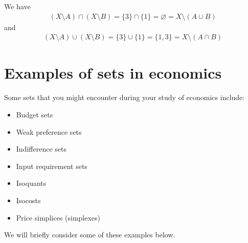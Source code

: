 \documentclass[letterpaper,10pt,english]{jupyterBook}
\begin{document}
\sphinxAtStartPar
We have
\begin{equation*}
\begin{split}(X \setminus A) \cap (X \setminus B) = \{3\} \cap \{1\} = \varnothing = X \setminus (A \cup B)\end{split}
\end{equation*}
\sphinxAtStartPar
and
\begin{equation*}
\begin{split}(X \setminus A) \cup (X \setminus B) = \{3\} \cup \{1\} = \{1, 3\} = X \setminus (A \cap B)\end{split}
\end{equation*}

\section{Examples of sets in economics}
\label{\detokenize{02.sets_numbers_coordinates_distances:examples-of-sets-in-economics}}
\sphinxAtStartPar
Some sets that you might encounter during your study of economics include:
\begin{itemize}
\item {} 
\sphinxAtStartPar
Budget sets

\item {} 
\sphinxAtStartPar
Weak preference sets

\item {} 
\sphinxAtStartPar
Indifference sets

\item {} 
\sphinxAtStartPar
Input requirement sets

\item {} 
\sphinxAtStartPar
Isoquants

\item {} 
\sphinxAtStartPar
Isocosts

\item {} 
\sphinxAtStartPar
Price simplices (simplexes)

\end{itemize}

\sphinxAtStartPar
We will briefly consider some of these examples below.
\end{document}
